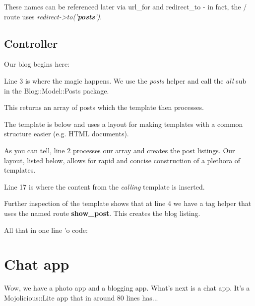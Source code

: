 \documentclass[14pt]{extreport}
\begin{document}
These names can be referenced later via url\_for and redirect\_to - in fact,
the / route uses \textit{redirect->to('\textbf{posts}')}.

\subsection{Controller}

Our blog begins here:



Line 3 is where the magic happens. We use the \textit{posts} helper and call
the \textit{all} sub in the Blog::Model::Posts package.  

This returns an array of posts which the template then processes.



The template is below and uses a layout for making templates with a common
structure easier (e.g. HTML documents).



As you can tell, line 2 processes our array and creates the post listings.  Our
layout, listed below, allows for rapid and concise construction of a plethora
of templates.



Line 17 is where the content from the \textit{calling} template is inserted.

Further inspection of the template shows that at line 4 we have a tag helper that
uses the named route \textbf{show\_post}.  This creates the blog listing.

All that in one line 'o code:



\section{Chat app}

Wow, we have a photo app and a blogging app.  What's next is a chat app.  It's
a Mojolicious::Lite app that in around 80 lines has...
\end{document}
